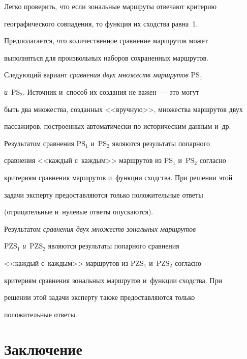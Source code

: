 Легко проверить, что если зональные маршруты отвечают критерию 


географического совпадения, то функция их сходства равна~1.





Предполагается, что количественное сравнение маршрутов может 


выполняться для произвольных наборов сохраненных маршрутов.





Следующий вариант \textit{сравнения двух множеств маршрутов} $\mathrm{PS}_1$ 


\textit{и}~$\mathrm{PS}_2$. Источник и~способ их создания не важен~--- это могут 


быть два множества, созданных <<вручную>>, множества маршрутов двух 


пассажиров, по\-стро\-ен\-ных автоматически по историческим данным и~др. 


Результатом сравнения $\mathrm{PS}_1$ и~$\mathrm{PS}_2$ являются результаты попарного 


сравнения <<каждый с~каждым>> маршрутов из $\mathrm{PS}_1$ и~$\mathrm{PS}_2$ согласно 


критериям сравнения маршрутов и~функции сходства. При решении этой 


задачи эксперту предостав\-ля\-ют\-ся только положительные ответы 


(отрицательные и~нулевые ответы опускаются).





Результатом \textit{сравнения двух множеств зональных маршрутов} 


$\mathrm{PZS}_1$ \textit{и}~$\mathrm{PZS}_2$ являются результаты попарного срав\-не\-ния 


<<каждый с~каждым>> маршрутов из $\mathrm{PZS}_1$ и~$\mathrm{PZS}_2$ согласно 


критериям сравнения зональных маршрутов и~функции сходства. При 


решении этой задачи эксперту так\-же предос\-тав\-ля\-ют\-ся только 


положительные ответы.





\section{Заключение} %





